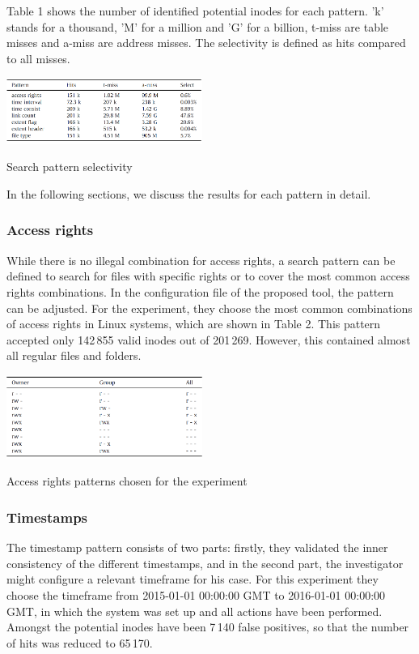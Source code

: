 \documentclass{acm_proc_article-sp}
\begin{document}
Table 1 shows the number of identified potential inodes for each pattern. 'k' stands for a thousand, 'M' for a million and 'G' for a billion, t-miss are table misses and a-miss are address misses. The selectivity is defined as hits compared to all misses.

\begin{table}
\centering
\includegraphics[width=0.48\textwidth]{images/selectivity.png}
	\caption{Search pattern selectivity}
\end{table}


In the following sections, we discuss the results for each pattern in detail.

\subsubsection{Access rights}

While there is no illegal combination for access rights, a search pattern can be defined to search for files with specific rights or to cover the most common access rights combinations. In the configuration file of the proposed tool, the pattern can be adjusted. For the experiment, they choose the most common combinations of access rights in Linux systems, which are shown in Table 2.
This pattern accepted only 142\,855 valid inodes out of 201\,269. However, this contained almost all regular files and folders.

\begin{table}
\centering
\includegraphics[width=0.48\textwidth]{images/rights.png}
	\caption{Access rights patterns chosen for the experiment}
\end{table}

\subsubsection{Timestamps}

The timestamp pattern consists of two parts: firstly, they validated the inner consistency of the different timestamps, and in the second part, the investigator might configure a relevant timeframe for his case. For this experiment they choose the timeframe from 2015-01-01 00:00:00 GMT to 2016-01-01 00:00:00 GMT, in which the system was set up and all actions have been performed. Amongst the potential inodes have been 7\,140 false positives, so that the number of hits was reduced to 65\,170.
\end{document}
